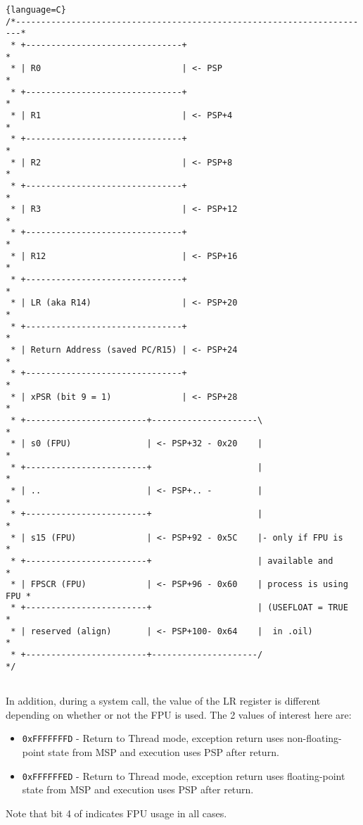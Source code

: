 \begin{lstlisting}{language=C}
/*-----------------------------------------------------------------------*
 * +-------------------------------+                                     *
 * | R0                            | <- PSP                              *
 * +-------------------------------+                                     *
 * | R1                            | <- PSP+4                            *
 * +-------------------------------+                                     *
 * | R2                            | <- PSP+8                            *
 * +-------------------------------+                                     *
 * | R3                            | <- PSP+12                           *
 * +-------------------------------+                                     *
 * | R12                           | <- PSP+16                           *
 * +-------------------------------+                                     *
 * | LR (aka R14)                  | <- PSP+20                           *
 * +-------------------------------+                                     *
 * | Return Address (saved PC/R15) | <- PSP+24                           *
 * +-------------------------------+                                     *
 * | xPSR (bit 9 = 1)              | <- PSP+28                           *
 * +------------------------+---------------------\                      *
 * | s0 (FPU)               | <- PSP+32 - 0x20    |                      *
 * +------------------------+                     |                      *
 * | ..                     | <- PSP+.. -         |                      *
 * +------------------------+                     |                      *
 * | s15 (FPU)              | <- PSP+92 - 0x5C    |- only if FPU is      *
 * +------------------------+                     | available and        *
 * | FPSCR (FPU)            | <- PSP+96 - 0x60    | process is using FPU *
 * +------------------------+                     | (USEFLOAT = TRUE     *
 * | reserved (align)       | <- PSP+100- 0x64    |  in .oil)            *
 * +------------------------+---------------------/                      */
 
\end{lstlisting}

In addition, during a system call, the value of the LR register is different depending on whether or not the FPU is used. The 2 values of interest here are: 
\begin{itemize}
  \item \texttt{0xFFFFFFFD} - Return to Thread mode, exception return uses non-floating-point state from MSP and execution uses PSP after return.
  \item \texttt{0xFFFFFFED} - Return to Thread mode, exception return uses floating-point state from MSP and execution uses PSP after return.
\end{itemize}
Note that bit 4 of  indicates FPU usage in all cases.

